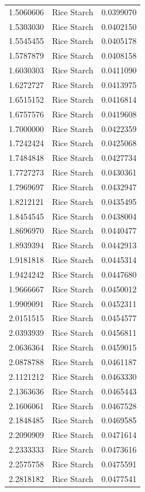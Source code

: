 \documentclass[
  12pt,
]{article}
\begin{document}
{\begin{longtable}[]{@{}rlr@{}}
1.5060606 & Rice Starch & 0.0399070 \\
1.5303030 & Rice Starch & 0.0402150 \\
1.5545455 & Rice Starch & 0.0405178 \\
1.5787879 & Rice Starch & 0.0408158 \\
1.6030303 & Rice Starch & 0.0411090 \\
1.6272727 & Rice Starch & 0.0413975 \\
1.6515152 & Rice Starch & 0.0416814 \\
1.6757576 & Rice Starch & 0.0419608 \\
1.7000000 & Rice Starch & 0.0422359 \\
1.7242424 & Rice Starch & 0.0425068 \\
1.7484848 & Rice Starch & 0.0427734 \\
1.7727273 & Rice Starch & 0.0430361 \\
1.7969697 & Rice Starch & 0.0432947 \\
1.8212121 & Rice Starch & 0.0435495 \\
1.8454545 & Rice Starch & 0.0438004 \\
1.8696970 & Rice Starch & 0.0440477 \\
1.8939394 & Rice Starch & 0.0442913 \\
1.9181818 & Rice Starch & 0.0445314 \\
1.9424242 & Rice Starch & 0.0447680 \\
1.9666667 & Rice Starch & 0.0450012 \\
1.9909091 & Rice Starch & 0.0452311 \\
2.0151515 & Rice Starch & 0.0454577 \\
2.0393939 & Rice Starch & 0.0456811 \\
2.0636364 & Rice Starch & 0.0459015 \\
2.0878788 & Rice Starch & 0.0461187 \\
2.1121212 & Rice Starch & 0.0463330 \\
2.1363636 & Rice Starch & 0.0465443 \\
2.1606061 & Rice Starch & 0.0467528 \\
2.1848485 & Rice Starch & 0.0469585 \\
2.2090909 & Rice Starch & 0.0471614 \\
2.2333333 & Rice Starch & 0.0473616 \\
2.2575758 & Rice Starch & 0.0475591 \\
2.2818182 & Rice Starch & 0.0477541 \\

\end{longtable}}
\end{document}
